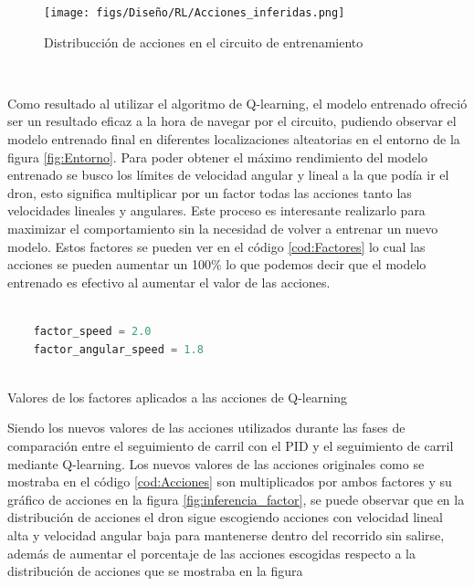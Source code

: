 \begin{figure} [H]
  \begin{center}
    \texttt{[image: figs/Diseño/RL/Acciones\_inferidas.png]}
  \end{center}
  \caption{Distribucción de acciones en el circuito de entrenamiento}
  \label{fig:inferencia}
\end{figure}\

Como resultado al utilizar el algoritmo de Q-learning, el modelo entrenado ofreció ser un resultado eficaz a la hora de navegar por el circuito, pudiendo observar 
el modelo entrenado final en diferentes localizaciones alteatorias en el entorno de la figura \ref{fig:Entorno}. Para poder obtener el máximo rendimiento del modelo entrenado se busco los límites de velocidad
angular y lineal a la que podía ir el dron, esto significa multiplicar por un factor todas las acciones tanto las velocidades lineales y angulares. Este proceso es interesante 
realizarlo para maximizar el comportamiento sin la necesidad de volver a entrenar un nuevo modelo. Estos factores se pueden ver en el código  \ref{cod:Factores} lo cual 
las acciones se pueden aumentar un 100\% lo que podemos decir que el modelo entrenado es efectivo al aumentar el valor de las acciones. \newline

\begin{code}[h]
  \begin{lstlisting}[language=Python]

    factor_speed = 2.0
    factor_angular_speed = 1.8
   
  \end{lstlisting}
  \caption[Factores]{Valores de los factores aplicados a las acciones de Q-learning}
  \label{cod:Factores}
  \end{code} 

Siendo los nuevos valores de las acciones utilizados durante las fases de comparación entre el seguimiento de carril con el PID y el seguimiento de carril mediante Q-learning. Los nuevos
valores de las acciones originales como se mostraba en el código \ref{cod:Acciones} son multiplicados por ambos factores
y su gráfico de acciones en la figura \ref{fig:inferencia_factor}, se puede observar que en la distribución de acciones el dron
sigue escogiendo acciones con velocidad lineal alta y velocidad angular baja para mantenerse dentro del recorrido sin salirse, además de aumentar el porcentaje de las acciones escogidas respecto a la distribución de acciones
que se mostraba en la figura \label{fig:inferencia}

